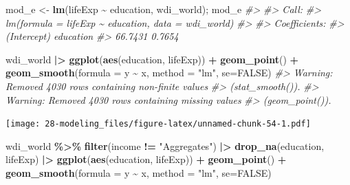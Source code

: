 \documentclass[
  xelatex, ja=standard]{bxjsbook}
\newenvironment{Shaded}{\begin{snugshade}}{\end{snugshade}}
\newcommand{\AttributeTok}[1]{\textcolor[rgb]{0.13,0.29,0.53}{#1}}
\newcommand{\CommentTok}[1]{\textcolor[rgb]{0.56,0.35,0.01}{\textit{#1}}}
\newcommand{\ConstantTok}[1]{\textcolor[rgb]{0.56,0.35,0.01}{#1}}
\newcommand{\FunctionTok}[1]{\textcolor[rgb]{0.13,0.29,0.53}{\textbf{#1}}}
\newcommand{\NormalTok}[1]{#1}
\newcommand{\OtherTok}[1]{\textcolor[rgb]{0.56,0.35,0.01}{#1}}
\newcommand{\SpecialCharTok}[1]{\textcolor[rgb]{0.81,0.36,0.00}{\textbf{#1}}}
\newcommand{\StringTok}[1]{\textcolor[rgb]{0.31,0.60,0.02}{#1}}
\theoremstyle{definition}
\theoremstyle{definition}
\theoremstyle{definition}
\theoremstyle{definition}
\theoremstyle{remark}
\begin{document}
\begin{Shaded}
\begin{Highlighting}[]
\NormalTok{mod\_e }\OtherTok{\textless{}{-}} \FunctionTok{lm}\NormalTok{(lifeExp }\SpecialCharTok{\textasciitilde{}}\NormalTok{ education, wdi\_world); mod\_e}
\CommentTok{\#\textgreater{} }
\CommentTok{\#\textgreater{} Call:}
\CommentTok{\#\textgreater{} lm(formula = lifeExp \textasciitilde{} education, data = wdi\_world)}
\CommentTok{\#\textgreater{} }
\CommentTok{\#\textgreater{} Coefficients:}
\CommentTok{\#\textgreater{} (Intercept)    education  }
\CommentTok{\#\textgreater{}     66.7431       0.7654}
\end{Highlighting}
\end{Shaded}

\begin{Shaded}
\begin{Highlighting}[]
\NormalTok{wdi\_world }\SpecialCharTok{|\textgreater{}} \FunctionTok{ggplot}\NormalTok{(}\FunctionTok{aes}\NormalTok{(education, lifeExp)) }\SpecialCharTok{+} \FunctionTok{geom\_point}\NormalTok{() }\SpecialCharTok{+} \FunctionTok{geom\_smooth}\NormalTok{(}\AttributeTok{formula =}\NormalTok{ y }\SpecialCharTok{\textasciitilde{}}\NormalTok{ x, }\AttributeTok{method =} \StringTok{"lm"}\NormalTok{, }\AttributeTok{se=}\ConstantTok{FALSE}\NormalTok{)}
\CommentTok{\#\textgreater{} Warning: Removed 4030 rows containing non{-}finite values}
\CommentTok{\#\textgreater{} (\textasciigrave{}stat\_smooth()\textasciigrave{}).}
\CommentTok{\#\textgreater{} Warning: Removed 4030 rows containing missing values}
\CommentTok{\#\textgreater{} (\textasciigrave{}geom\_point()\textasciigrave{}).}
\end{Highlighting}
\end{Shaded}

\texttt{[image: 28-modeling\_files/figure-latex/unnamed-chunk-54-1.pdf]}

\begin{Shaded}
\begin{Highlighting}[]
\NormalTok{wdi\_world }\SpecialCharTok{\%\textgreater{}\%} \FunctionTok{filter}\NormalTok{(income }\SpecialCharTok{!=} \StringTok{"Aggregates"}\NormalTok{) }\SpecialCharTok{|\textgreater{}} \FunctionTok{drop\_na}\NormalTok{(education, lifeExp) }\SpecialCharTok{|\textgreater{}} \FunctionTok{ggplot}\NormalTok{(}\FunctionTok{aes}\NormalTok{(education, lifeExp)) }\SpecialCharTok{+} \FunctionTok{geom\_point}\NormalTok{() }\SpecialCharTok{+} \FunctionTok{geom\_smooth}\NormalTok{(}\AttributeTok{formula =}\NormalTok{ y }\SpecialCharTok{\textasciitilde{}}\NormalTok{ x, }\AttributeTok{method =} \StringTok{"lm"}\NormalTok{, }\AttributeTok{se=}\ConstantTok{FALSE}\NormalTok{)}
\end{Highlighting}
\end{Shaded}
\end{document}
